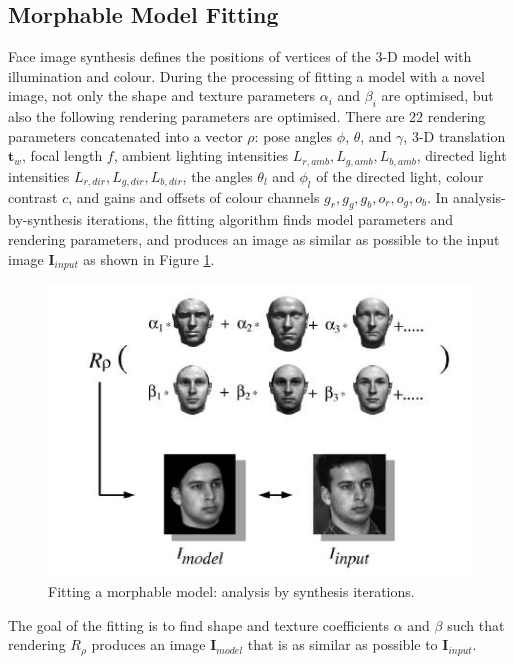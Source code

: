 \subsection{Morphable Model Fitting}
Face image synthesis defines the positions of vertices of the 3-D model with illumination and colour. During the processing of fitting a model with a novel image, not only the shape and texture parameters $\alpha_i$ and $\beta_i$ are optimised, but also the following rendering parameters are optimised. There are $22$ rendering parameters concatenated into a vector $\rho$: pose angles $\phi$, $\theta$, and $\gamma$, 3-D translation $\mathbf{t}_w$, focal length $f$, ambient lighting intensities $L_{r,amb},L_{g,amb},L_{b,amb}$, directed light intensities $L_{r,dir},L_{g,dir},L_{b,dir}$, the angles $\theta_l$ and $\phi_l$ of the directed light, colour contrast $c$, and gains and offsets of colour channels $g_r,g_g,g_b,o_r,o_g,o_b$. In analysis-by-synthesis iterations, the fitting algorithm finds model parameters and rendering parameters, and produces an image as similar as possible to the input image $\mathbf{I}_{input}$ as shown in \mbox{Figure} \ref{fig:modelvsinput}. 
\begin{figure}[t]
 \begin{center}
 \includegraphics[width=0.77\columnwidth]{ch2/figures/3DMMfitting.jpg} 
 \caption{Fitting a morphable model: analysis by synthesis iterations.\cite{Blanz2003}}
  \label{fig:modelvsinput}
 \end{center}
\end{figure}
The goal of the fitting is to find shape and texture coefficients $\alpha$ and $\beta$ such that rendering $R_{\rho}$ produces an image $\mathbf{I}_{model}$ that is as similar as possible to $\mathbf{I}_{input}$.

